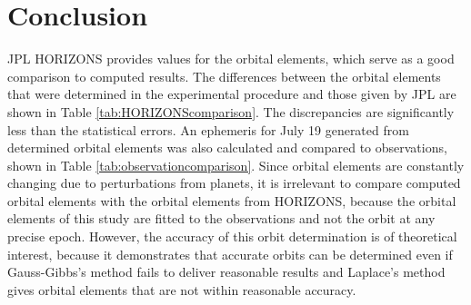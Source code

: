 \documentclass[12pt,journal,compsoc]{IEEEtran}
\begin{document}
\section{Conclusion}
JPL HORIZONS provides values for the orbital elements, which serve as a good comparison to computed results.
The differences between the orbital elements that were determined in the experimental procedure and those given by JPL 
are shown in Table \ref{tab:HORIZONScomparison}.
The discrepancies are significantly less than the statistical errors. 
An ephemeris for July 19 generated from determined orbital elements was also calculated and compared to observations, 
shown in Table \ref{tab:observationcomparison}.
Since orbital elements are constantly changing due to perturbations from planets,
it is irrelevant to compare computed orbital elements with the 
orbital elements from HORIZONS, because the orbital elements of this study 
are fitted to the observations and not the orbit at any precise epoch.
However, the accuracy of this orbit determination is of theoretical interest, because 
it demonstrates that accurate orbits can be determined even if Gauss-Gibbs's method fails to 
deliver reasonable results and Laplace's method gives orbital elements that are not within reasonable accuracy.

\end{document}
